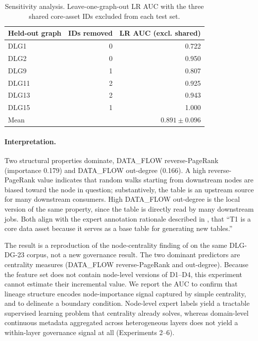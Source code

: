 \documentclass[11pt,a4paper]{article}
\begin{document}
\begin{table}[htb]
\centering
\small
\caption{Sensitivity analysis. Leave-one-graph-out LR AUC with the
  three shared core-asset IDs excluded from each test set.}
\label{tab:dlg_sensitivity}
\begin{tabular}{lrr}
\toprule
Held-out graph & IDs removed & LR AUC (excl. shared) \\
\midrule
DLG1 & 0 & 0.722 \\
DLG2 & 0 & 0.950 \\
DLG9 & 1 & 0.807 \\
DLG11 & 2 & 0.925 \\
DLG13 & 2 & 0.943 \\
DLG15 & 1 & 1.000 \\
\midrule
Mean & & $0.891 \pm 0.096$ \\
\bottomrule
\end{tabular}
\end{table}

\paragraph{Interpretation.}
Two structural properties dominate, DATA\_FLOW reverse-PageRank
(importance 0.179) and DATA\_FLOW out-degree (0.166). A high
reverse-PageRank value indicates that random walks starting from
downstream nodes are biased toward the node in question; substantively,
the table is an upstream source for many downstream consumers. High
DATA\_FLOW out-degree is the local version of the same property, since
the table is directly read by many downstream jobs. Both align with
the expert annotation rationale described in \citet{chen2024dlgdg},
that ``T1 is a core data asset because it serves as a base table for
generating new tables.''

The result is a reproduction of the node-centrality finding of
\citet{chen2023centrality} on the same DLG-DG-23 corpus, not a new
governance result. The two dominant predictors are centrality measures
(DATA\_FLOW reverse-PageRank and out-degree). Because the feature set
does not contain node-level versions of D1--D4, this experiment cannot
estimate their incremental value. We report the AUC to confirm that
lineage structure encodes node-importance signal captured by simple
centrality, and to delineate a boundary condition.
Node-level expert labels yield a tractable supervised learning problem
that centrality already solves, whereas domain-level continuous metadata
aggregated across heterogeneous layers does not yield a within-layer
governance signal at all (Experiments 2--6).
\end{document}
